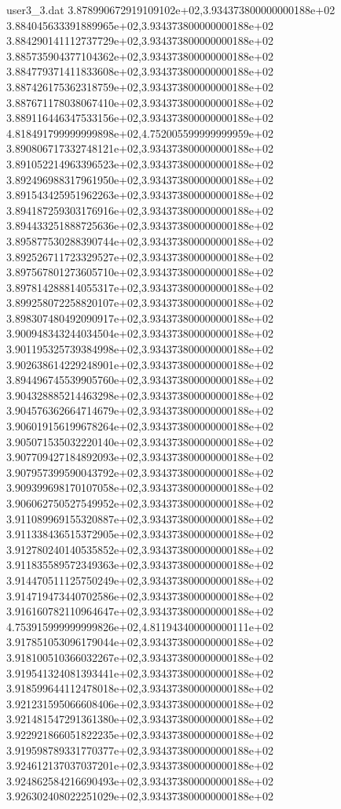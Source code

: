 \begin{filecontents}{user3_3.dat}
3.878990672919109102e+02,3.934373800000000188e+02
3.884045633391889965e+02,3.934373800000000188e+02
3.884290141112737729e+02,3.934373800000000188e+02
3.885735904377104362e+02,3.934373800000000188e+02
3.884779371411833608e+02,3.934373800000000188e+02
3.887426175362318759e+02,3.934373800000000188e+02
3.887671178038067410e+02,3.934373800000000188e+02
3.889116446347533156e+02,3.934373800000000188e+02
4.818491799999999898e+02,4.752005599999999959e+02
3.890806717332748121e+02,3.934373800000000188e+02
3.891052214963396523e+02,3.934373800000000188e+02
3.892496988317961950e+02,3.934373800000000188e+02
3.891543425951962263e+02,3.934373800000000188e+02
3.894187259303176916e+02,3.934373800000000188e+02
3.894433251888725636e+02,3.934373800000000188e+02
3.895877530288390744e+02,3.934373800000000188e+02
3.892526711723329527e+02,3.934373800000000188e+02
3.897567801273605710e+02,3.934373800000000188e+02
3.897814288814055317e+02,3.934373800000000188e+02
3.899258072258820107e+02,3.934373800000000188e+02
3.898307480492090917e+02,3.934373800000000188e+02
3.900948343244034504e+02,3.934373800000000188e+02
3.901195325739384998e+02,3.934373800000000188e+02
3.902638614229248901e+02,3.934373800000000188e+02
3.894496745539905760e+02,3.934373800000000188e+02
3.904328885214463298e+02,3.934373800000000188e+02
3.904576362664714679e+02,3.934373800000000188e+02
3.906019156199678264e+02,3.934373800000000188e+02
3.905071535032220140e+02,3.934373800000000188e+02
3.907709427184892093e+02,3.934373800000000188e+02
3.907957399590043792e+02,3.934373800000000188e+02
3.909399698170107058e+02,3.934373800000000188e+02
3.906062750527549952e+02,3.934373800000000188e+02
3.911089969155320887e+02,3.934373800000000188e+02
3.911338436515372905e+02,3.934373800000000188e+02
3.912780240140535852e+02,3.934373800000000188e+02
3.911835589572349363e+02,3.934373800000000188e+02
3.914470511125750249e+02,3.934373800000000188e+02
3.914719473440702586e+02,3.934373800000000188e+02
3.916160782110964647e+02,3.934373800000000188e+02
4.753915999999999826e+02,4.811943400000000111e+02
3.917851053096179044e+02,3.934373800000000188e+02
3.918100510366032267e+02,3.934373800000000188e+02
3.919541324081393441e+02,3.934373800000000188e+02
3.918599644112478018e+02,3.934373800000000188e+02
3.921231595066608406e+02,3.934373800000000188e+02
3.921481547291361380e+02,3.934373800000000188e+02
3.922921866051822235e+02,3.934373800000000188e+02
3.919598789331770377e+02,3.934373800000000188e+02
3.924612137037037201e+02,3.934373800000000188e+02
3.924862584216690493e+02,3.934373800000000188e+02
3.926302408022251029e+02,3.934373800000000188e+02

\end{filecontents}

